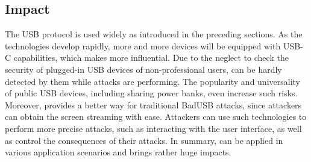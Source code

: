 \subsection{Impact}

The USB protocol is used widely as introduced in the preceding sections.  As the
technologies develop rapidly, more and more devices will be equipped with USB-C
capabilities, which makes \tool more influential.  Due to the neglect to
check the security of plugged-in USB devices of non-professional users, \tool
can be hardly detected by them while attacks are performing.  The popularity
and universality of public USB devices, including sharing power banks, even
increase such risks.  Moreover, \tool provides a better way for traditional
BadUSB attacks, since attackers can obtain the screen streaming with ease.
Attackers can use such technologies to perform more precise attacks, such as
interacting with the user interface, as well as control the consequences of their
attacks.  In summary, \tool can be applied in various application scenarios and
brings rather huge impacts.
